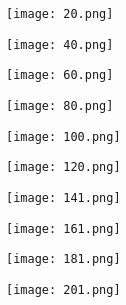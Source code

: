 \documentclass[12pt]{article}
\begin{document}
\begin{figure}[H]
	\centering
	\begin{minipage}{.5\textwidth}
		\centering
		\texttt{[image: 20.png]}
	\end{minipage}%
	\begin{minipage}{.5\textwidth}
		\centering
		\texttt{[image: 40.png]}
	\end{minipage}
\end{figure}

\begin{figure}[H]
	\centering
	\begin{minipage}{.5\textwidth}
		\centering
		\texttt{[image: 60.png]}
	\end{minipage}%
	\begin{minipage}{.5\textwidth}
		\centering
		\texttt{[image: 80.png]}
	\end{minipage}
\end{figure}

\begin{figure}[H]
	\centering
	\begin{minipage}{.5\textwidth}
		\centering
		\texttt{[image: 100.png]}
	\end{minipage}%
	\begin{minipage}{.5\textwidth}
		\centering
		\texttt{[image: 120.png]}
	\end{minipage}
\end{figure}

\begin{figure}[H]
	\centering
	\begin{minipage}{.5\textwidth}
		\centering
		\texttt{[image: 141.png]}
	\end{minipage}%
	\begin{minipage}{.5\textwidth}
		\centering
		\texttt{[image: 161.png]}
	\end{minipage}
\end{figure}

\begin{figure}[H]
	\centering
	\begin{minipage}{.5\textwidth}
		\centering
		\texttt{[image: 181.png]}
	\end{minipage}%
	\begin{minipage}{.5\textwidth}
		\centering
		\texttt{[image: 201.png]}
	\end{minipage}
\end{figure}
\end{document}
